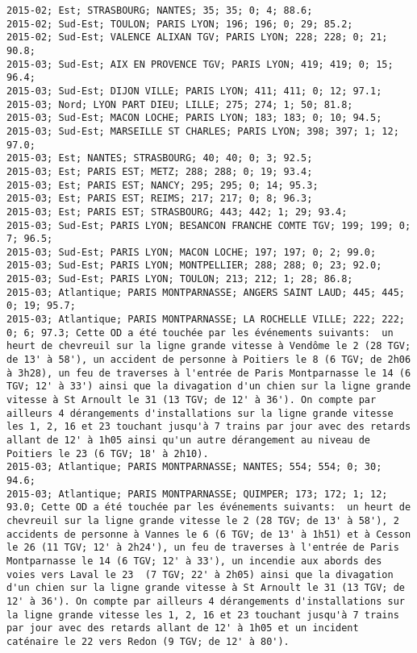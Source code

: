 \documentclass{article}
\begin{document}
\begin{Verbatim}[commandchars=\\\{\}]
2015-02; Est; STRASBOURG; NANTES; 35; 35; 0; 4; 88.6; 
2015-02; Sud-Est; TOULON; PARIS LYON; 196; 196; 0; 29; 85.2; 
2015-02; Sud-Est; VALENCE ALIXAN TGV; PARIS LYON; 228; 228; 0; 21; 90.8; 
2015-03; Sud-Est; AIX EN PROVENCE TGV; PARIS LYON; 419; 419; 0; 15; 96.4; 
2015-03; Sud-Est; DIJON VILLE; PARIS LYON; 411; 411; 0; 12; 97.1; 
2015-03; Nord; LYON PART DIEU; LILLE; 275; 274; 1; 50; 81.8; 
2015-03; Sud-Est; MACON LOCHE; PARIS LYON; 183; 183; 0; 10; 94.5; 
2015-03; Sud-Est; MARSEILLE ST CHARLES; PARIS LYON; 398; 397; 1; 12; 97.0; 
2015-03; Est; NANTES; STRASBOURG; 40; 40; 0; 3; 92.5; 
2015-03; Est; PARIS EST; METZ; 288; 288; 0; 19; 93.4; 
2015-03; Est; PARIS EST; NANCY; 295; 295; 0; 14; 95.3; 
2015-03; Est; PARIS EST; REIMS; 217; 217; 0; 8; 96.3; 
2015-03; Est; PARIS EST; STRASBOURG; 443; 442; 1; 29; 93.4; 
2015-03; Sud-Est; PARIS LYON; BESANCON FRANCHE COMTE TGV; 199; 199; 0; 7; 96.5; 
2015-03; Sud-Est; PARIS LYON; MACON LOCHE; 197; 197; 0; 2; 99.0; 
2015-03; Sud-Est; PARIS LYON; MONTPELLIER; 288; 288; 0; 23; 92.0; 
2015-03; Sud-Est; PARIS LYON; TOULON; 213; 212; 1; 28; 86.8; 
2015-03; Atlantique; PARIS MONTPARNASSE; ANGERS SAINT LAUD; 445; 445; 0; 19; 95.7; 
2015-03; Atlantique; PARIS MONTPARNASSE; LA ROCHELLE VILLE; 222; 222; 0; 6; 97.3; Cette OD a été touchée par les événements suivants:  un heurt de chevreuil sur la ligne grande vitesse à Vendôme le 2 (28 TGV; de 13' à 58'), un accident de personne à Poitiers le 8 (6 TGV; de 2h06 à 3h28), un feu de traverses à l'entrée de Paris Montparnasse le 14 (6 TGV; 12' à 33') ainsi que la divagation d'un chien sur la ligne grande vitesse à St Arnoult le 31 (13 TGV; de 12' à 36'). On compte par ailleurs 4 dérangements d'installations sur la ligne grande vitesse les 1, 2, 16 et 23 touchant jusqu'à 7 trains par jour avec des retards allant de 12' à 1h05 ainsi qu'un autre dérangement au niveau de  Poitiers le 23 (6 TGV; 18' à 2h10).
2015-03; Atlantique; PARIS MONTPARNASSE; NANTES; 554; 554; 0; 30; 94.6; 
2015-03; Atlantique; PARIS MONTPARNASSE; QUIMPER; 173; 172; 1; 12; 93.0; Cette OD a été touchée par les événements suivants:  un heurt de chevreuil sur la ligne grande vitesse le 2 (28 TGV; de 13' à 58'), 2 accidents de personne à Vannes le 6 (6 TGV; de 13' à 1h51) et à Cesson le 26 (11 TGV; 12' à 2h24'), un feu de traverses à l'entrée de Paris Montparnasse le 14 (6 TGV; 12' à 33'), un incendie aux abords des voies vers Laval le 23  (7 TGV; 22' à 2h05) ainsi que la divagation d'un chien sur la ligne grande vitesse à St Arnoult le 31 (13 TGV; de 12' à 36'). On compte par ailleurs 4 dérangements d'installations sur la ligne grande vitesse les 1, 2, 16 et 23 touchant jusqu'à 7 trains par jour avec des retards allant de 12' à 1h05 et un incident caténaire le 22 vers Redon (9 TGV; de 12' à 80').

\end{Verbatim}
\end{document}
